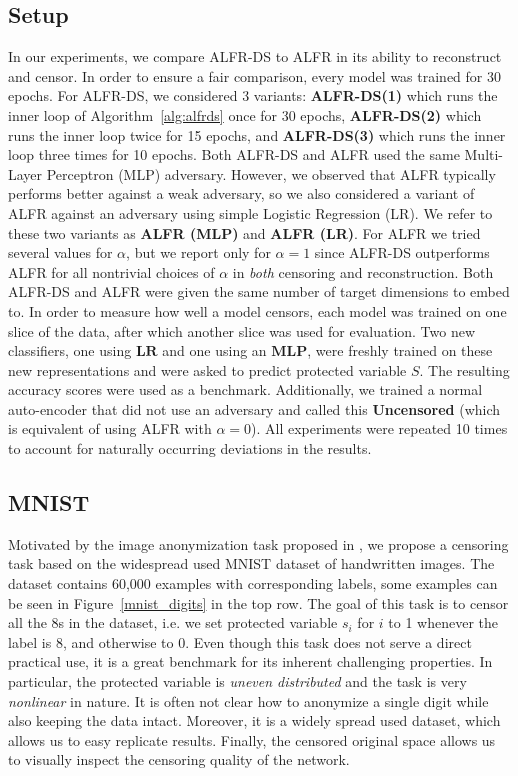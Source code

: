 \documentclass[nohyperref]{article}
\theoremstyle{plain}
\theoremstyle{definition}
\theoremstyle{remark}
\begin{document}
\subsection{Setup}
In our experiments, we compare ALFR-DS to ALFR in its ability to reconstruct and censor. In order to ensure a fair comparison, every model was trained for 30 epochs. For ALFR-DS, we considered 3 variants: \textbf{ALFR-DS(1)} which runs the inner loop of Algorithm~\ref{alg:alfrds} once for 30 epochs, \textbf{ALFR-DS(2)} which runs the inner loop twice for 15 epochs, and \textbf{ALFR-DS(3)} which runs the inner loop three times for 10 epochs. Both ALFR-DS and ALFR used the same Multi-Layer Perceptron (MLP) adversary. However, we observed that ALFR typically performs better against a weak adversary, so we also considered a variant of ALFR against an adversary using simple Logistic Regression (LR). We refer to these two variants as \textbf{ALFR (MLP)} and \textbf{ALFR (LR)}. For ALFR we tried several values for $\alpha$, but we report only for $\alpha = 1$ since ALFR-DS outperforms ALFR for all nontrivial choices of $\alpha$ in \emph{both} censoring and reconstruction. Both ALFR-DS and ALFR were given the same number of target dimensions to embed to. In order to measure how well a model censors, each model was trained on one slice of the data, after which another slice was used for evaluation. Two new classifiers, one using $\textbf{LR}$ and one using an $\textbf{MLP}$, were freshly trained on these new representations and were asked to predict protected variable $S$. The resulting accuracy scores were used as a benchmark. Additionally, we trained a normal auto-encoder that did not use an adversary and called this \textbf{Uncensored} (which is equivalent of using ALFR with $\alpha = 0$). All experiments were repeated 10 times to account for naturally occurring deviations in the results.

\subsection{MNIST}
Motivated by the image anonymization task proposed in \cite{edwards2016censoring}, we propose a censoring task based on the widespread used MNIST dataset of handwritten images. The dataset contains 60,000 examples with corresponding labels, some examples can be seen in Figure~\ref{mnist_digits} in the top row. The goal of this task is to censor all the 8s in the dataset, i.e. we set protected variable $s_i$ for $i$ to 1 whenever the label is 8, and otherwise to 0. Even though this task does not serve a direct practical use, it is a great benchmark for its inherent challenging properties. In particular, the protected variable is \emph{uneven distributed} and the task is very \emph{nonlinear} in nature. It is often not clear how to anonymize a single digit while also keeping the data intact. Moreover, it is a widely spread used dataset, which allows us to easy replicate results. Finally, the censored original space allows us to visually inspect the censoring quality of the network. 
\end{document}
